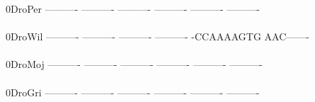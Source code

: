\documentclass[11pt,twoside,reqno,a4paper]{article}
\begin{document}
{0\hspace*{4\charwidth}DroPer	----------	----------	----------	----------	----------	----------	\\
\hspace*{5\charwidth}\hspace*{7\charwidth}\hspace*{1\charwidth}\hspace*{1\charwidth}\hspace*{1\charwidth}\hspace*{1\charwidth}\hspace*{1\charwidth}\hspace*{1\charwidth}\\
0\hspace*{4\charwidth}DroWil	----------	----------	----------	----------	-CCAAAAGTG	AAC-------	\\
\hspace*{5\charwidth}\hspace*{7\charwidth}\hspace*{1\charwidth}\hspace*{1\charwidth}\hspace*{1\charwidth}\hspace*{1\charwidth}\hspace*{1\charwidth}\hspace*{1\charwidth}\\
0\hspace*{4\charwidth}DroMoj	----------	----------	----------	----------	----------	----------	\\
\hspace*{5\charwidth}\hspace*{7\charwidth}\hspace*{1\charwidth}\hspace*{1\charwidth}\hspace*{1\charwidth}\hspace*{1\charwidth}\hspace*{1\charwidth}\hspace*{1\charwidth}\\
0\hspace*{4\charwidth}DroGri	----------	----------	----------	----------	----------	----------	\\
\hspace*{5\charwidth}\hspace*{7\charwidth}\hspace*{1\charwidth}\hspace*{1\charwidth}\hspace*{1\charwidth}\hspace*{1\charwidth}\hspace*{1\charwidth}\hspace*{1\charwidth}\\
}
\end{document}

